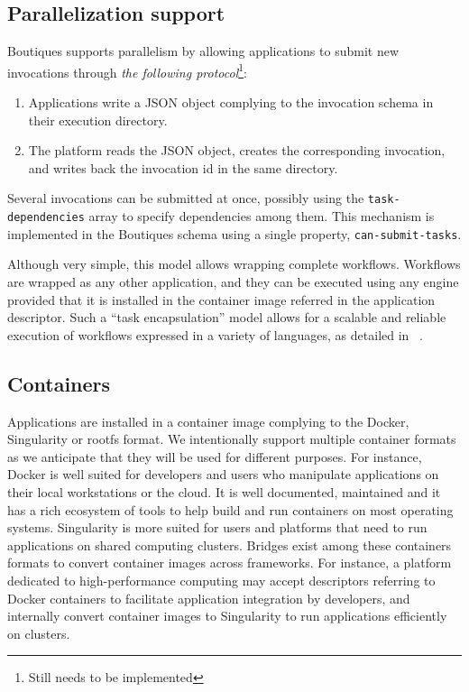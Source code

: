 \documentclass{article}
\newcommand{\boutiques}{Boutiques\xspace}
\newcommand{\notimplementedyet}[1]{\color{blue}\emph{#1}\footnote{Still needs to be implemented}\color{black}\xspace}
\begin{document}
\subsection{Parallelization support}
\label{sec:parallelization}
\boutiques supports parallelism by allowing applications to submit new
invocations through \notimplementedyet{the following protocol}:
\begin{enumerate}
\item Applications write a JSON object complying to the invocation
  schema in their execution directory.
\item The platform reads the JSON object, creates the corresponding
  invocation, and writes back the invocation id in the same directory.
\end{enumerate}
Several invocations can be submitted at once, possibly using the
\texttt{task-dependencies} array to specify dependencies among
them. This mechanism is implemented in the Boutiques schema using a
single property, \texttt{can-submit-tasks}.

Although very simple, this model allows wrapping complete
workflows. Workflows are wrapped as any other application, and they
can be executed using any engine provided that it is installed in the
container image referred in the application descriptor. Such a ``task
encapsulation'' model allows for a scalable and reliable execution of
workflows expressed in a variety of languages, as detailed in
~\cite{glatard2017software}.

\subsection{Containers}

Applications are installed in a container image complying to the
Docker, Singularity or rootfs format. We intentionally support
multiple container formats as we anticipate that they will be used for
different purposes. For instance, Docker is well suited for developers
and users who manipulate applications on their local workstations or the
cloud. It is well documented, maintained and it has a rich ecosystem of
tools to help build and run containers on most operating systems. Singularity
is more suited for users and platforms that need to run applications
on shared computing clusters. Bridges exist among these containers
formats to convert container images across frameworks. For instance, a
platform dedicated to high-performance computing may accept descriptors
referring to Docker containers to facilitate application integration
by developers, and internally convert container images to Singularity
to run applications efficiently on clusters.
\end{document}
